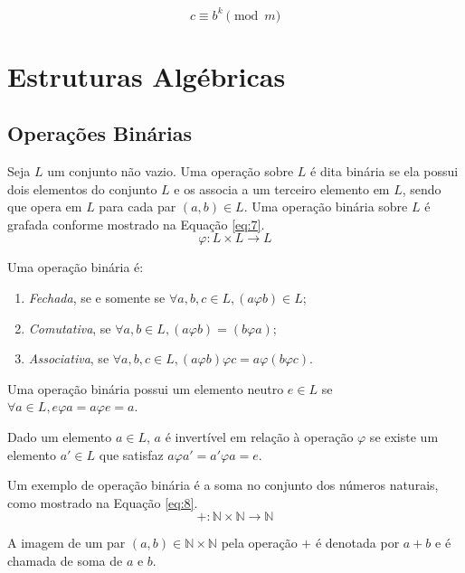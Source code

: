 \begin{equation}
  c \equiv b^{k}\pmod m \label{eq:6}
\end{equation}

%
%
\section{Estruturas Algébricas}

%
%
\subsection{Operações Binárias}
Seja \(L\) um conjunto não vazio. Uma operação  sobre \(L\) é dita binária se ela possui dois elementos do conjunto \(L\) e os associa a um terceiro elemento em \(L\), sendo que opera em \(L\) para cada par \((a,b) \in L\). Uma operação binária sobre \(L\) é grafada conforme mostrado na Equação \ref{eq:7}.
\begin{equation}
  \varphi: L \times L \to L \label{eq:7}
\end{equation}

Uma operação binária é:
\begin{enumerate}
  \item \textit{Fechada}, se e somente se \( \forall a,b,c  \in L, (a \varphi b) \in L \);
  \item \textit{Comutativa}, se \( \forall a,b \in L , (a \varphi b) = (b \varphi a)\);
  \item \textit{Associativa}, se \( \forall a,b,c \in L, (a \varphi b) \varphi c = a \varphi (b \varphi c)\).
\end{enumerate}

Uma operação binária possui um elemento neutro \(e \in L\) se \( \forall a \in L, e \varphi a = a \varphi e = a\).

\par Dado um elemento \(a \in L\), \(a\) é invertível em relação à operação \( \varphi \) se existe  um elemento \(a' \in L\) que satisfaz \(a \varphi a' = a' \varphi a = e\). 

Um exemplo de operação binária é a soma no conjunto dos números naturais, como mostrado na Equação \ref{eq:8}.
\begin{equation}
  +: \mathbb{N} \times \mathbb{N} \to \mathbb{N} \label{eq:8}
\end{equation}

A imagem de um par \((a,b) \in \mathbb{N} \times \mathbb{N}\) pela operação \(+\) é denotada por \(a + b\) e é chamada de soma de \(a\) e \(b\).

